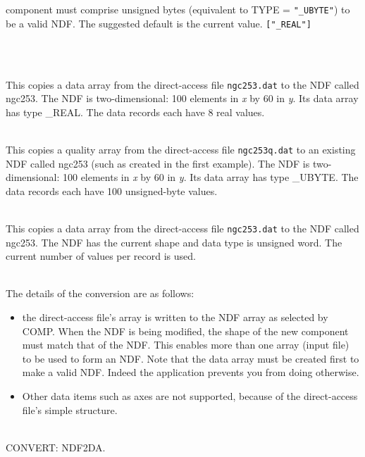 \documentclass[twoside,11pt]{article}
\newcommand{\htmlref}[2]{#1}
\newcommand{\CONVERT}{{\footnotesize CONVERT}}
\newlength{\sstexampleslength}
\newcommand{\sstexamples}[1]{
   \goodbreak
   \item[Examples:] \mbox{} \\
   \vspace{-3.5ex}
   \begin{description}
      #1
   \end{description}
}
\newcommand{\sstexamplesubsection}[2]{\sloppy
\item[\parbox{\sstexampleslength}{\ssttt #1}] \mbox{} \vspace{0.5ex}
\\ #2 \vspace{1.0ex}}
\newcommand{\sstnotes}[1]{\pagebreak[3] \item[Notes:] \mbox{} \\[1.3ex] #1}
\newcommand{\sstdiytopic}[2]{\goodbreak \item[{\hspace{-0.35em}#1\hspace{-0.35em}:}] \mbox{} \\[1.3ex] #2}
\newcommand{\ssthitemlist}[1]{
  \latexonly{
  \mbox{} \\
  \vspace{-3.5ex}
  }
  \begin{itemize}
     #1
  \end{itemize}
}
\newcommand{\sstitem}{\item}
\newcommand{\sstexamples}[1]{
   \item[\vspace{0.35ex}\htmlref{Examples:\vspace{-0.5ex}}{app_example}]
      \begin{description}
         #1
      \end{description}
      \\
   }
\newcommand{\sstexamplesubsection}[2]{
   \vspace{-1.0ex} \item[{\ssttt #1}] #2 \vspace{0.2ex}}
\newcommand{\sstnotes}[1]{\item[Notes:]
      \begin{description}
         #1
      \end{description}
   }
\newcommand{\sstdiytopic}[2]{\\ \item[{#1}:]
      \begin{description}
         #2
      \end{description}
   }
\newcommand{\sstitem}{\item}
\begin{document}
{{{         component must comprise unsigned bytes (equivalent to TYPE =
         \texttt{"\_UBYTE"}) to be a valid NDF. The suggested default is the
         current value. \texttt{["\_REAL"]}
      }
   }
   \sstexamples{
      \sstexamplesubsection{
         da2ndf ngc253.dat ngc253 shape=[100,60] noperec=8
      }{
         This copies a data array from the direct-access file \texttt{ngc253.dat}
         to the NDF called ngc253.  The NDF is two-dimensional: 100
         elements in \textit{x} by 60 in \textit{y}.
         Its data array has type \_REAL.  
         The data records each have 8 real values.
      }
      \sstexamplesubsection{
         da2ndf ngc253q.dat ngc253 q 100 [100,60]
      }{
         This copies a quality array from the direct-access file
         \texttt{ngc253q.dat} to an existing NDF called ngc253 (such as created
         in the first example).  The NDF is two-dimensional: 100
         elements in \textit{x} by 60 in \textit{y}.  
         Its data array has type \_UBYTE.
         The data records each have 100 unsigned-byte values.
      }
      \sstexamplesubsection{
         da2ndf type="\_uword" in=ngc253.dat out=ngc253 $\backslash$
      }{
         This copies a data array from the direct-access file
         \texttt{ngc253.dat}
         to the NDF called ngc253.  The NDF has the current shape and
         data type is unsigned word.  The current number of values per
         record is used.
      }
   }
   \sstnotes{
      The details of the conversion are as follows:
      \ssthitemlist{

         \sstitem
            the direct-access file's array is written to the NDF array
            as selected by COMP.  When the NDF is being modified, the
            shape of the new component must match that of the NDF.  This
            enables more than one array (input file) to be used to form an
            NDF.  Note that the data array must be created first to make a
            valid NDF.  Indeed the application prevents you from doing
            otherwise.

         \sstitem
            Other data items such as axes are not supported, because of
            the direct-access file's simple structure.
      }
   }
   \sstdiytopic{
      Related Applications
   }{
      \CONVERT: \htmlref{NDF2DA}{NDF2DA}.
   }
}
\end{document}
